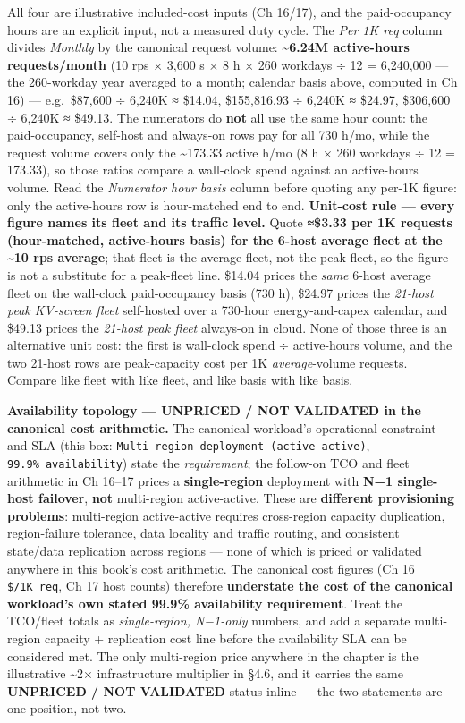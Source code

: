 All four are illustrative included-cost inputs (Ch 16/17), and the
paid-occupancy hours are an explicit input, not a measured duty cycle.
The \emph{Per 1K req} column divides \emph{Monthly} by the canonical
request volume: \textbf{\textasciitilde6.24M active-hours
requests/month} (10 rps × 3,600 s × 8 h × 260 workdays ÷ 12 = 6,240,000
--- the 260-workday year averaged to a month; calendar basis above,
computed in Ch 16) --- e.g.~\$87,600 ÷ 6,240K ≈ \$14.04, \$155,816.93 ÷
6,240K ≈ \$24.97, \$306,600 ÷ 6,240K ≈ \$49.13. The numerators do
\textbf{not} all use the same hour count: the paid-occupancy, self-host
and always-on rows pay for all 730 h/mo, while the request volume covers
only the \textasciitilde173.33 active h/mo (8 h × 260 workdays ÷ 12 =
173.33), so those ratios compare a wall-clock spend against an
active-hours volume. Read the \emph{Numerator hour basis} column before
quoting any per-1K figure: only the active-hours row is hour-matched end
to end. \textbf{Unit-cost rule --- every figure names its fleet and its
traffic level.} Quote \textbf{≈\$3.33 per 1K requests (hour-matched,
active-hours basis) for the 6-host average fleet at the
\textasciitilde10 rps average}; that fleet is the average fleet, not the
peak fleet, so the figure is not a substitute for a peak-fleet line.
\$14.04 prices the \emph{same} 6-host average fleet on the wall-clock
paid-occupancy basis (730 h), \$24.97 prices the \emph{21-host peak
KV-screen fleet} self-hosted over a 730-hour energy-and-capex calendar,
and \$49.13 prices the \emph{21-host peak fleet} always-on in cloud.
None of those three is an alternative unit cost: the first is wall-clock
spend ÷ active-hours volume, and the two 21-host rows are peak-capacity
cost per 1K \emph{average}-volume requests. Compare like fleet with like
fleet, and like basis with like basis.

\textbf{Availability topology --- UNPRICED / NOT VALIDATED in the
canonical cost arithmetic.} The canonical workload's operational
constraint and SLA (this box:
\texttt{Multi-region\ deployment\ (active-active)},
\texttt{99.9\%\ availability}) state the \emph{requirement}; the
follow-on TCO and fleet arithmetic in Ch 16--17 prices a
\textbf{single-region} deployment with \textbf{N−1 single-host
failover}, \textbf{not} multi-region active-active. These are
\textbf{different provisioning problems}: multi-region active-active
requires cross-region capacity duplication, region-failure tolerance,
data locality and traffic routing, and consistent state/data replication
across regions --- none of which is priced or validated anywhere in this
book's cost arithmetic. The canonical cost figures (Ch 16
\texttt{\$/1K\ req}, Ch 17 host counts) therefore \textbf{understate the
cost of the canonical workload's own stated 99.9\% availability
requirement}. Treat the TCO/fleet totals as \emph{single-region,
N−1-only} numbers, and add a separate multi-region capacity +
replication cost line before the availability SLA can be considered met.
The only multi-region price anywhere in the chapter is the illustrative
\textasciitilde2× infrastructure multiplier in §4.6, and it carries the
same \textbf{UNPRICED / NOT VALIDATED} status inline --- the two
statements are one position, not two.

